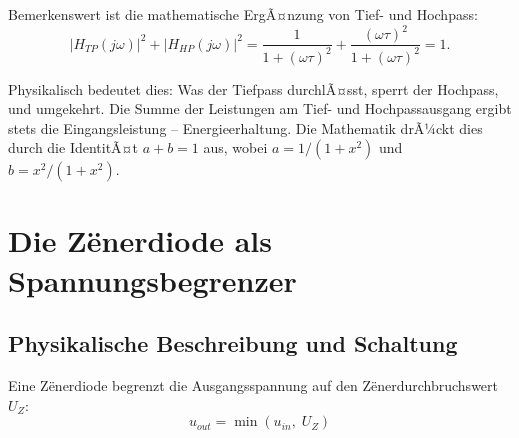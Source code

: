 ﻿\documentclass[12pt, a4paper]{article}
\begin{document}
	Bemerkenswert ist die mathematische ErgÃ¤nzung von Tief- und Hochpass:
	\begin{equation}
		|H_{TP}(j\omega)|^2 + |H_{HP}(j\omega)|^2 = \frac{1}{1+(\omega\tau)^2} + \frac{(\omega\tau)^2}{1+(\omega\tau)^2} = 1.
	\end{equation}
	
	Physikalisch bedeutet dies: Was der Tiefpass durchlÃ¤sst, sperrt der Hochpass, und umgekehrt. Die Summe der Leistungen am Tief- und Hochpassausgang ergibt stets die Eingangsleistung -- Energieerhaltung. Die Mathematik drÃ¼ckt dies durch die IdentitÃ¤t $a + b = 1$ aus, wobei $a = 1/(1+x^2)$ und $b = x^2/(1+x^2)$.
	
	\section{Die Z\"{e}nerdiode als Spannungsbegrenzer}
	
	\subsection{Physikalische Beschreibung und Schaltung}
	
	Eine Z\"{e}nerdiode begrenzt die Ausgangsspannung auf den Z\"{e}nerdurchbruchswert $U_Z$:
	\begin{equation}
		u_{out} = \min(u_{in},\; U_Z)
	\end{equation}
	
\end{document}

